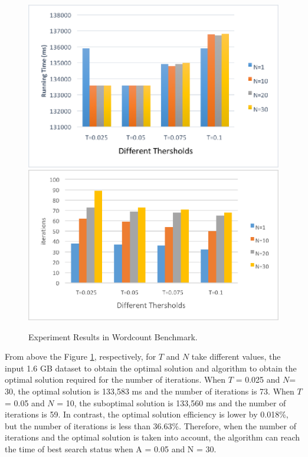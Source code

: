 \begin{figure}[!htbp]
	\centering
	{\includegraphics[width=0.48\linewidth]{wordcountRunningTime.eps}}
	{\includegraphics[width=0.48\linewidth]{wordcountIterations.eps}}\\
	\centering
	\caption{Experiment Results in Wordcount Benchmark.}
	\vspace{-3mm}
	\label{fig:wordcountcompare}
\end{figure}
\par From above the Figure \ref{fig:wordcountcompare}, respectively, for $T$ and $N$ take different values, the input 1.6 GB dataset to obtain the optimal solution and algorithm to obtain the optimal solution required for the number of iterations. When $T$ = 0.025 and $N$= 30, the optimal solution is 133,583 ms and the number of iterations is 73. When $T$ = 0.05 and $N$ = 10, the suboptimal solution is 133,560 ms and the number of iterations is 59. In contrast, the optimal solution efficiency is lower by 0.018\%, but the number of iterations is less than 36.63\%. Therefore, when the number of iterations and the optimal solution is taken into account, the algorithm can reach the time of best search status when A = 0.05 and N = 30.
